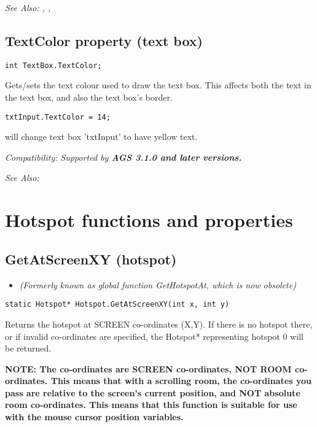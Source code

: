 \it{See Also:} ,
,


\subsection{TextColor property (text box)}\label{TextBox.TextColor}%

\begin{verbatim}
int TextBox.TextColor;
\end{verbatim}
Gets/sets the text colour used to draw the text box. This affects both the text in the text
box, and also the text box's border.

\begin{verbatim}
txtInput.TextColor = 14;
\end{verbatim}

will change text box 'txtInput' to have yellow text.

\it{Compatibility:} Supported by \bf{AGS 3.1.0} and later versions.

\it{See Also:} 



\section{Hotspot functions and properties}%


\subsection{GetAtScreenXY (hotspot)}\label{Hotspot.GetAtScreenXY}%

\begin{itemize}
\item \it{(Formerly known as global function GetHotspotAt, which is now obsolete)}
\end{itemize}

\begin{verbatim}
static Hotspot* Hotspot.GetAtScreenXY(int x, int y)
\end{verbatim}
Returns the hotspot at SCREEN co-ordinates (X,Y).
If there is no hotspot there, or if invalid co-ordinates are specified,
the Hotspot* representing hotspot 0 will be returned.

\bf{NOTE:} The co-ordinates are SCREEN co-ordinates, NOT ROOM co-ordinates. This
means that with a scrolling room, the co-ordinates you pass are relative to
the screen's current position, and NOT absolute room co-ordinates. This
means that this function is suitable for use with the mouse cursor position
variables.

